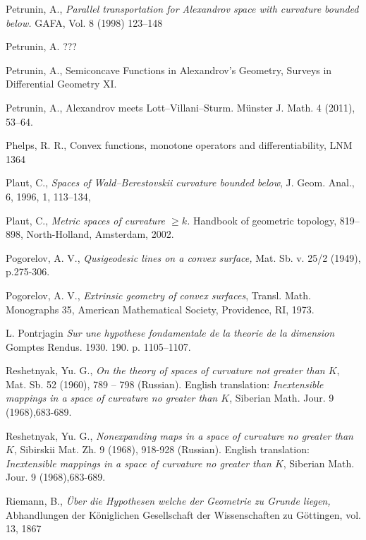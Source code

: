 \begin{thebibliography}{52}
 Petrunin, A., \textit{Parallel transportation for Alexandrov space with curvature bounded below.}  GAFA, Vol. 8 (1998) 123--148

 Petrunin, A. ???

 Petrunin, A.,  Semiconcave Functions in Alexandrov's Geometry, Surveys in Differential Geometry XI.

 Petrunin, A., Alexandrov meets Lott--Villani--Sturm. M\"unster J. Math. 4 (2011), 53--64.

Phelps, R. R., Convex functions, monotone operators and differentiability, LNM 1364

 {Plaut, C.},
      \textit{{Spaces of Wald--Berestovskii curvature bounded below}},
    {J. Geom. Anal.},
     {6},
     {1996},
     {1},
      {113--134},

Plaut, C., \textit{Metric spaces of curvature $\ge k$.} 
Handbook of geometric topology,  819--898, North-Holland, Amsterdam, 2002.

 Pogorelov, A. V., \textit{Qusigeodesic lines on a convex surface,} Mat. Sb. v. 25/2
(1949), p.275-306.

  Pogorelov, A. V., 
\textit{Extrinsic geometry of convex surfaces}, 
Transl. Math. Monographs 35, 
American Mathematical Society, Providence, RI, 1973.


 L. Pontrjagin \textit{Sur une hypothese fondamentale de la theorie de la dimension} Gomptes Rendus.  1930.  190. p. 1105--1107.

Reshetnyak, Yu. G.,
\textit{On the theory of spaces of curvature not greater than $K$},
 Mat. Sb. 52 (1960), 789 -- 798 (Russian).
English translation: \textit{Inextensible mappings in a space of curvature
no greater than $K$}, Siberian Math. Jour. 9 (1968),683-689.

Reshetnyak, Yu. G.,
\textit{Nonexpanding maps in a space of curvature no greater than $K$},
Sibirskii Mat. Zh. 9 (1968), 918-928 (Russian).
English translation: \textit{Inextensible mappings in a space of curvature
no greater than $K$}, Siberian Math. Jour. 9 (1968),683-689.


 Riemann, B., \textit{\"Uber die Hypothesen welche der Geometrie zu Grunde liegen,}
Abhandlungen der K\"oniglichen Gesellschaft der Wissenschaften zu G\"ottingen, vol. 13, 1867


\end{thebibliography}
